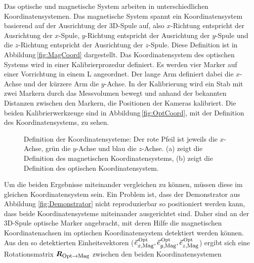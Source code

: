 Das optische und magnetische System arbeiten in unterschiedlichen Koordinatensystemen. Das magnetische System spannt ein Koordinatensystem basierend auf der Ausrichtung der 3D-Spule auf, also $x$-Richtung entspricht der Ausrichtung der $x$-Spule, $y$-Richtung entspricht der Ausrichtung der $y$-Spule und die $z$-Richtung entspricht der Ausrichtung der $z$-Spule. Diese Definition ist in Abbildung\,\ref{fig:MagCoord} dargestellt. Das Koordinatensystem des optischen Systems wird in einer Kalibrierprozedur definiert. Es werden vier Marker auf einer Vorrichtung in einem \grqq L \grqq  angeordnet. Der lange Arm definiert dabei die $x$-Achse und der kürzere Arm die $y$-Achse. In der Kalibrierung wird ein Stab mit zwei Markern durch das Messvolumen bewegt und anhand der bekannten Distanzen zwischen den Markern, die Positionen der Kameras kalibriert. Die beiden Kalibrierwerkzeuge sind in Abbildung\,\ref{fig:OptCoord}, mit der Definition des Koordinatensystems, zu sehen. 
\begin{figure}
    \centering
    \caption{Definition der Koordinatensysteme: Der rote Pfeil ist jeweils die $x$-Achse, grün die $y$-Achse und blau die $z$-Achse. (a) zeigt die Definition des magnetischen Koordinatensystems, (b) zeigt die Definition des optischen Koordinatensystem.}
    \label{fig:CoordSystems}
\end{figure}

Um die beiden Ergebnisse miteinander vergleichen zu können, müssen diese im gleichen Koordinatensystem sein. Ein Problem ist, dass der Demonstrator aus Abbildung \ref{fig:Demonstrator} nicht reproduzierbar so positioniert werden kann, dass beide Koordinatensysteme miteinander ausgerichtet sind. Daher sind an der 3D-Spule optische Marker angebracht, mit deren Hilfe die magnetischen Koordinatenachsen im optischen Koordinatensystem detektiert werden können. Aus den so detektierten Einheitsvektoren ($\vec{e}_{\textrm{\footnotesize{$x$,Mag}}}^\text{\,Opt},\vec{e}_{\textrm{\footnotesize{$y$,Mag}}}^\text{\,Opt},\vec{e}_{\textrm{\footnotesize{$z$,Mag}}}^\text{\,Opt}$) ergibt sich eine Rotationsmatrix $\mbox{\boldmath ${R}$}_{\textrm{\footnotesize{Opt$\rightarrow$Mag}}}$ zwischen den beiden Koordinatensystemen 

